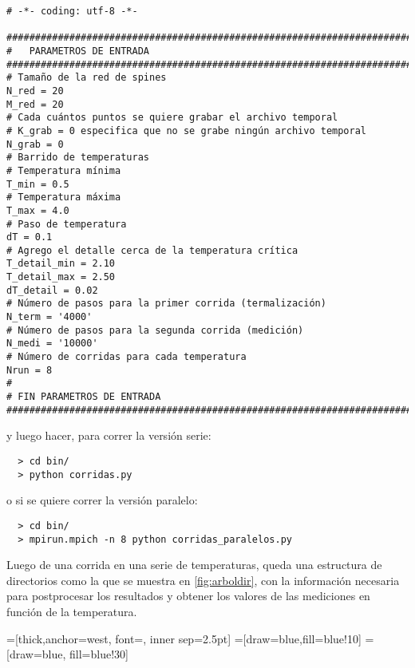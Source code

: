 \begin{verbatim}
# -*- coding: utf-8 -*-

###############################################################################       
#   PARAMETROS DE ENTRADA
###############################################################################
# Tamaño de la red de spines
N_red = 20
M_red = 20
# Cada cuántos puntos se quiere grabar el archivo temporal
# K_grab = 0 especifica que no se grabe ningún archivo temporal
N_grab = 0     
# Barrido de temperaturas
# Temperatura mínima
T_min = 0.5
# Temperatura máxima
T_max = 4.0
# Paso de temperatura
dT = 0.1
# Agrego el detalle cerca de la temperatura crítica
T_detail_min = 2.10
T_detail_max = 2.50
dT_detail = 0.02
# Número de pasos para la primer corrida (termalización)
N_term = '4000'
# Número de pasos para la segunda corrida (medición)
N_medi = '10000'
# Número de corridas para cada temperatura
Nrun = 8
#
# FIN PARAMETROS DE ENTRADA
###############################################################################

\end{verbatim}


y luego hacer, para correr la versión serie:

\begin{verbatim}
  > cd bin/
  > python corridas.py
\end{verbatim}

o si se quiere correr la versión paralelo:

\begin{verbatim}
  > cd bin/
  > mpirun.mpich -n 8 python corridas_paralelos.py
\end{verbatim}

Luego de una corrida en una serie de temperaturas, queda una estructura de directorios
como la que se muestra en \eqref{fig:arboldir}, con la información necesaria 
para postprocesar
los resultados y obtener los valores de las mediciones en función de la temperatura.


=[thick,anchor=west, 
font={\scriptsize\ttfamily}, inner sep=2.5pt]
=[draw=blue,fill=blue!10]
=[draw=blue, fill=blue!30]


